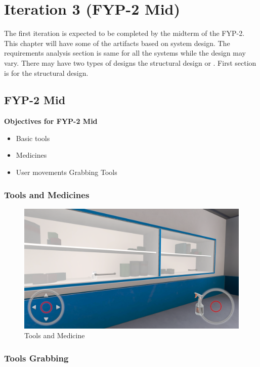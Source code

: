\chapter{Iteration 3 (FYP-2 Mid)}
\label{ch:iter3}

The first iteration is expected to be completed by the midterm of the FYP-2.
This chapter will have some of the artifacts based on system design. The requirements analysis section is same for all the systems while the design may vary. There may have two types of designs the structural design or . First section is for the structural design.


\section{FYP-2 Mid}
\textbf{Objectives for FYP-2 Mid}
	\begin{itemize}
		\item Basic tools
		\item Medicines 
		\item User movements
		\iten Grabbing Tools
	\end{itemize}
\newpage
\subsection{Tools and Medicines}
\begin{figure}[h]
	\centering
	\includegraphics[width=0.65\linewidth]{Images/Tools and Medicine.png}
	\caption{Tools and Medicine}
	\label{fig:system-diagram}
\end{figure}

\subsection{Tools Grabbing}

